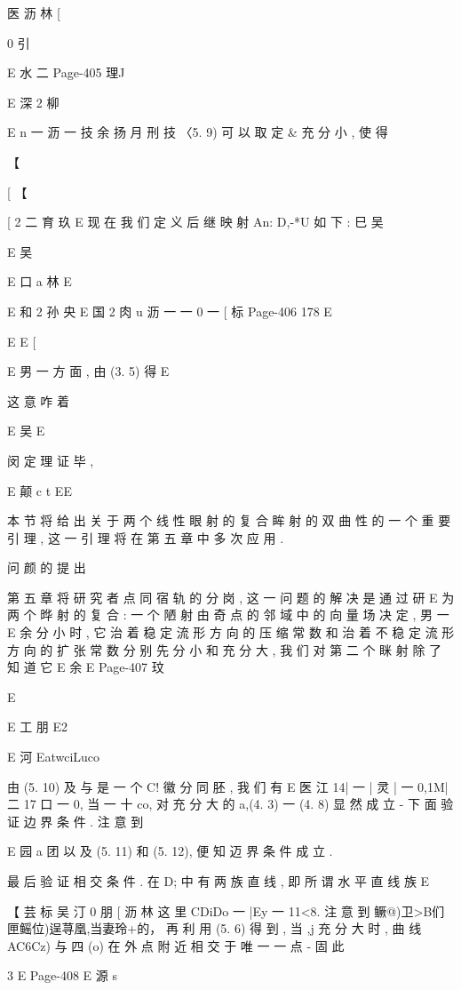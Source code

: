 {{{{{{{{{医 沥 林 [

0 引

E 水 二
Page-405
理J

E 深 2 柳

E n 一 沥 一 技 余 扬 月 刑 技
〈5. 9) 可 以 取 定 & 充 分 小 , 使 得

【

[
【

[ 2 二 育 玖
E
现 在 我 们 定 义 后 继 映 射 An: D,-*U 如 下 :
巳 吴

E 吴

E 口
a
林
E

E
和
2 孙 央
E 国 2 肉
u 沥 一 一
0 一
[
标
Page-406
178 E

E
E
[

E
男 一 方 面 , 由 (3. 5) 得
E

这 意 咋 着

E 吴
E

闵
定 理 证 毕 ,

E 颠 c t EE

本 节 将 给 出 关 于 两 个 线 性 眼 射 的 复 合 眸 射 的 双 曲 性 的 一 个 重
要 引 理 , 这 一 引 理 将 在 第 五 章 中 多 次 应 用 .

问 颜 的 提 出

第 五 章 将 研 究 者 点 同 宿 轨 的 分 岗 , 这 一 问 题 的 解 决 是 通 过 研
E
为 两 个 晔 射 的 复 合 : 一 个 陋 射 由 奇 点 的 邻 域 中 的 向 量 场 决 定 , 男 一
E
余
分 小 时 , 它 治 着 稳 定 流 形 方 向 的 压 缩 常 数 和 治 着 不 稳 定 流 形 方 向
的 扩 张 常 数 分 别 先 分 小 和 充 分 大 , 我 们 对 第 二 个 眯 射 除 了 知 道 它
E
余
E
Page-407
玟

E

E
工
朋
E2

E 河
EatwciLuco

由 (5. 10) 及 与 是 一 个 C! 徽 分 同 胚 , 我 们 有
E
医 江
14| 一 | 灵 | 一 0,1M| 二 17 口 一 0, 当 一 十 co,
对 充 分 大 的 a,(4. 3) 一 (4. 8) 显 然 成 立 -
下 面 验 证 边 界 条 件 . 注 意 到

E 园 a 团
以 及 (5. 11) 和 (5. 12), 便 知 迈 界 条 件 成 立 .

最 后 验 证 相 交 条 件 . 在 D; 中 有 两 族 直 线 , 即 所 谓 水 平 直 线 族
E

【 芸 标 吴 汀 0 朋
[ 沥 林
这 里 CDiDo 一 {|Ey 一 11<8}. 注 意 到
鳜@)卫>B们匣鳐位)逞荨凰,当妻玲+的，
再 利 用 (5. 6) 得 到 , 当 ,j 充 分 大 时 , 曲 线 AC6Cz) 与 四 (o) 在 外 点
附 近 相 交 于 唯 一 一 点 - 固 此

3
E
Page-408
E 源 s

}}}}}}}}}
